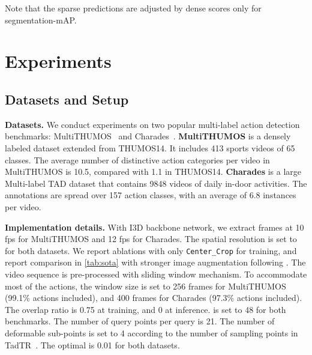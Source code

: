 \documentclass{article}
\renewcommand{\paragraph}[1]{\vspace{1.25mm}\noindent\textbf{#1}}
\begin{document}
Note that the sparse predictions are adjusted by dense scores only for segmentation-mAP.

\section{Experiments}
\vspace{-0.3em}
\subsection{Datasets and Setup}
\vspace{-0.3em}
\paragraph{Datasets.}
We conduct experiments on two popular multi-label action detection benchmarks: MultiTHUMOS~\cite{DBLP:journals/ijcv/YeungRJAMF18} and Charades~\cite{DBLP:conf/eccv/SigurdssonVWFLG16}. {\bf MultiTHUMOS} is a densely labeled dataset extended from THUMOS14. It includes 413 sports videos of 65 classes. The average number of distinctive action categories per video in MultiTHUMOS is 10.5, compared with 1.1 in THUMOS14. {\bf Charades} is a large Multi-label TAD dataset that contains 9848 videos of daily in-door activities. The annotations are spread over 157 action classes, with an average of 6.8 instances per video.

\paragraph{Implementation details.}
\label{parag:implement_details}
With I3D backbone network, we extract frames at 10 fps for MultiTHUMOS and 12 fps for Charades. The spatial resolution is set to  for both datasets. {We report ablations with only \texttt{Center\_Crop} for training, and report comparison in \cref{tab:sota} with stronger image augmentation following \cite{liu2022an}.} The video sequence is pre-processed with sliding window mechanism. To accommodate most of the actions, the window size is set to 256 frames for MultiTHUMOS (99.1\% actions included), and 400 frames for Charades (97.3\% actions included). The overlap ratio is 0.75 at training, and 0 at inference.  is set to 48 for both benchmarks. The number of query points per query  is 21. The number of deformable sub-points is set to 4 according to the number of sampling points in TadTR~\cite{DBLP:journals/corr/abs-2106-10271}.  {The optimal  is 0.01 for both datasets.}
\end{document}
